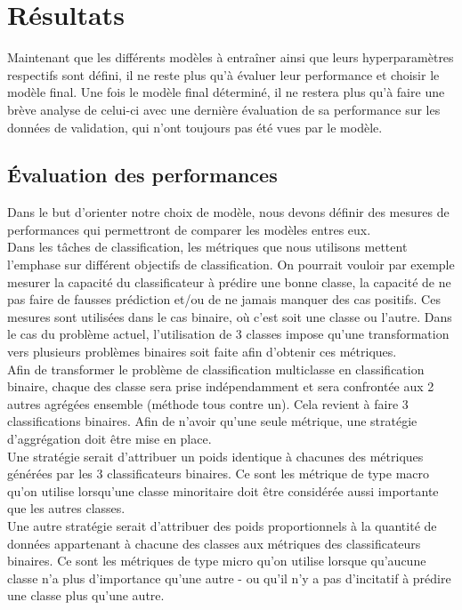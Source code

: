\section{Résultats}
Maintenant que les différents modèles à entraîner ainsi que leurs hyperparamètres respectifs sont défini, il ne reste plus qu'à évaluer leur performance et choisir le modèle final. Une fois le modèle final déterminé, il ne restera plus qu'à faire une brève analyse de celui-ci avec une dernière évaluation de sa performance sur les données de validation, qui n'ont toujours pas été vues par le modèle.  


\subsection{Évaluation des performances}
Dans le but d'orienter notre choix de modèle, nous devons définir des mesures de performances qui permettront de comparer les modèles entres eux. \\

Dans les tâches de classification, les métriques que nous utilisons mettent l'emphase sur différent objectifs de classification. On pourrait vouloir par exemple mesurer la capacité du classificateur à prédire une bonne classe, la capacité de ne pas faire de fausses prédiction et/ou de ne jamais manquer des cas positifs. Ces mesures sont utilisées dans le cas binaire, où c'est soit une classe ou l'autre. Dans le cas du problème actuel, l'utilisation de 3 classes impose qu'une transformation vers plusieurs problèmes binaires soit faite afin d'obtenir ces métriques. \\

Afin de transformer le problème de classification multiclasse en classification binaire, chaque des classe sera prise indépendamment et sera confrontée aux 2 autres agrégées ensemble (méthode tous contre un). Cela revient à faire 3 classifications binaires. Afin de n'avoir qu'une seule métrique, une stratégie d'aggrégation doit être mise en place. \\ Une stratégie serait d'attribuer un poids identique à chacunes des métriques générées par les 3 classificateurs binaires. Ce sont les métrique de type macro qu'on utilise lorsqu'une classe minoritaire doit être considérée aussi importante que les autres classes. \\ Une autre stratégie serait d'attribuer des poids proportionnels à la quantité de données appartenant à chacune des classes aux métriques des classificateurs binaires. Ce sont les métriques de type micro qu'on utilise lorsque qu'aucune classe n'a plus d'importance qu'une autre - ou qu'il n'y a pas d'incitatif à prédire une classe plus qu'une autre. \\


